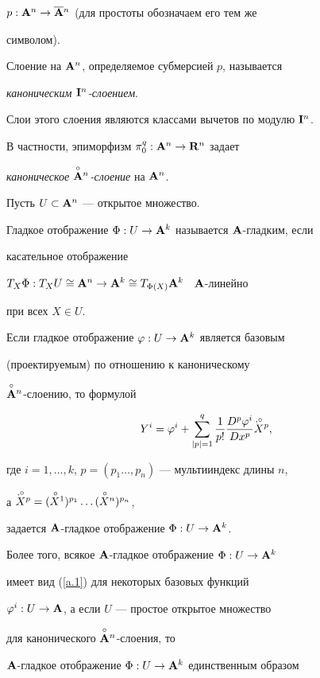 $p:{\bold A}^n\to\overline{{\bold A}}{}^n$ (для простоты обозначаем его тем же


символом).


Слоение на ${\bold A}^n$, определяемое субмерсией $p$, называется


{\it каноническим ${\bold I}^n$-слоением}.


Слои этого слоения являются классами вычетов по модулю ${\bold I}^n$.


В частности, эпиморфизм $\pi^q_0:{\bold A}^n\to{\bold R}^n$ задает


{\it каноническое $\overset{\circ}{{\bold A}}{}^n$-слоение} на ${\bold A}^n$.


 


Пусть $U\subset{\bold A}^n$ --- открытое множество.


Гладкое отображение $\Phi:U\to{\bold A}^k$ называется ${\bold A}$-гладким, если


касательное отображение


$T_X\Phi:T_XU\cong{\bold A}^n\to{\bold A}^k\cong T_{\Phi(X)}{\bold A}^k$ \ ${\bold A}$-линейно


при всех $X\in U$.


Если гладкое отображение $\varphi:U\to{\bold A}^k$ является базовым


(проектируемым) \cite{Mol} по отношению к каноническому


$\overset{\circ}{{\bold A}}{}^n$-слоению, то формулой


\begin{equation}


Y^{i}=\varphi^{i}+\sum^q_{|p|=1}\frac{1}{p!}


\frac{D^p\varphi^{i}}{Dx^p}\Xop, \label{a.1}


\end{equation}


где $i=1,\dotsc,k$, $p=(p_1\dotsc,p_n)$ --- мультииндекс длины $n$,


а $\Xop=({\puto X}{}^1)^{p_1}\dotsc


({\puto X}{}^n)^{p_n}$,


задается ${\bold A}$-гладкое отображение $\Phi:U\to{\bold A}^k$.


Более того, всякое ${\bold A}$-гладкое отображение $\Phi:U\to{\bold A}^k$


имеет вид (\ref{a.1}) для некоторых базовых функций


$\varphi^{i}:U\to{\bold A}$, а если $U$ --- простое открытое множество


\cite{Mol} для канонического $\overset{\circ}{{\bold A}}{}^n$-слоения, то


${\bold A}$-гладкое отображение $\Phi:U\to{\bold A}^k$ единственным образом


